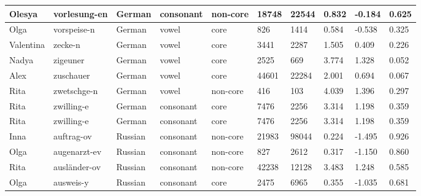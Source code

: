 \begin{longtable}{|p{1.2cm}|p{3cm}|p{1cm}|p{1.5cm}|p{1.5cm}|R{1.2cm}|R{1cm}|R{1cm}|R{0.8cm}|R{0.8cm}|}
Olesya    & vorlesung-en           & German        & consonant        & non-core  & 18748        & 22544          & 0.832                 & -0.184            & 0.625        \\ \hline
Olga      & vorspeise-n            & German        & vowel            & core      & 826          & 1414           & 0.584                 & -0.538            & 0.325        \\ \hline
Valentina & zecke-n                & German        & vowel            & core      & 3441         & 2287           & 1.505                 & 0.409             & 0.226        \\ \hline
Nadya     & zigeuner               & German        & vowel            & core      & 2525         & 669            & 3.774                 & 1.328             & 0.052        \\ \hline
Alex      & zuschauer              & German        & vowel            & core      & 44601        & 22284          & 2.001                 & 0.694             & 0.067        \\ \hline
Rita      & zwetschge-n            & German        & vowel            & non-core  & 416          & 103            & 4.039                 & 1.396             & 0.297        \\ \hline
Rita      & zwilling-e             & German        & consonant        & core      & 7476         & 2256           & 3.314                 & 1.198             & 0.359        \\ \hline
Rita      & zwilling-e             & German        & consonant        & core      & 7476         & 2256           & 3.314                 & 1.198             & 0.359        \\ \hline
Inna      & auftrag-ov             & Russian       & consonant        & non-core  & 21983        & 98044          & 0.224                 & -1.495            & 0.926        \\ \hline
Olga      & augenarzt-ev           & Russian       & consonant        & non-core  & 827          & 2612           & 0.317                 & -1.150            & 0.860        \\ \hline
Rita      & ausl\"{a}nder-ov       & Russian       & consonant        & non-core  & 42238        & 12128          & 3.483                 & 1.248             & 0.585        \\ \hline
Olga      & ausweis-y              & Russian       & consonant        & core      & 2475         & 6965           & 0.355                 & -1.035            & 0.681        \\ \hline

\end{longtable}
